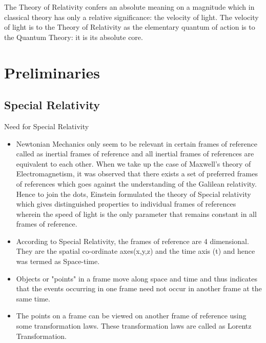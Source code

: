 \begin{savequote}[45mm]
The Theory of Relativity confers an absolute meaning on a magnitude which in classical theory has only a relative significance: the velocity of light. The velocity of light is to the Theory of Relativity as the elementary quantum of action is to the Quantum Theory: it is its absolute core.  
\end{savequote}
\chapter{Preliminaries}
\label{ch:preliminaries}
\section{Special Relativity}
\begin{tcolorbox}
    Need for Special Relativity
\end{tcolorbox}
\begin{itemize}
    \item Newtonian Mechanics only seem to be relevant in certain frames of reference called as inertial frames of reference and all inertial frames of references are equivalent to each other. When we take up the case of Maxwell's theory of Electromagnetism, it was observed that there exists a set of preferred frames of references which goes against the understanding of the Galilean relativity. Hence to join the dots, Einstein formulated the theory of Special relativity which gives distinguished properties to individual frames of references wherein the speed of light is the only parameter that remains constant in all frames of reference.
    \item According to Special Relativity, the frames of reference are 4 dimensional. They are the spatial co-ordinate axes(x,y,z) and the time axis (t) and hence was termed as Space-time.
    \item Objects or "points" in a frame move along space and time and thus indicates that the events occurring in one frame need not occur in another frame at the same time.
    \item The points on a frame can be viewed on another frame of reference using some transformation laws. These transformation laws are called as Lorentz Transformation.
\end{itemize}
